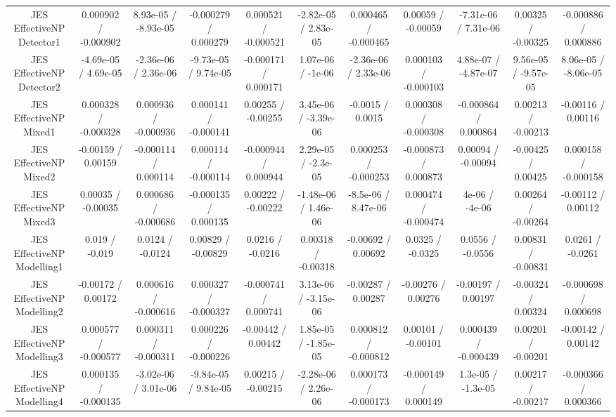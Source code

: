\begin{table}[htbp]
\begin{center}
\begin{tabular}{|c|c|c|c|c|c|c|c|c|c|c|}
  JES EffectiveNP Detector1 & 0.000902 / -0.000902 & 8.93e-05 / -8.93e-05 & -0.000279 / 0.000279 & 0.000521 / -0.000521 & -2.82e-05 / 2.83e-05 & 0.000465 / -0.000465 & 0.00059 / -0.00059 & -7.31e-06 / 7.31e-06 & 0.00325 / -0.00325 & -0.000886 / 0.000886 \\ 
  JES EffectiveNP Detector2 & -4.69e-05 / 4.69e-05 & -2.36e-06 / 2.36e-06 & -9.73e-05 / 9.74e-05 & -0.000171 / 0.000171 & 1.07e-06 / -1e-06 & -2.36e-06 / 2.33e-06 & 0.000103 / -0.000103 & 4.88e-07 / -4.87e-07 & 9.56e-05 / -9.57e-05 & 8.06e-05 / -8.06e-05 \\ 
  JES EffectiveNP Mixed1 & 0.000328 / -0.000328 & 0.000936 / -0.000936 & 0.000141 / -0.000141 & 0.00255 / -0.00255 & 3.45e-06 / -3.39e-06 & -0.0015 / 0.0015 & 0.000308 / -0.000308 & -0.000864 / 0.000864 & 0.00213 / -0.00213 & -0.00116 / 0.00116 \\ 
  JES EffectiveNP Mixed2 & -0.00159 / 0.00159 & -0.000114 / 0.000114 & 0.000114 / -0.000114 & -0.000944 / 0.000944 & 2.29e-05 / -2.3e-05 & 0.000253 / -0.000253 & -0.000873 / 0.000873 & 0.00094 / -0.00094 & -0.00425 / 0.00425 & 0.000158 / -0.000158 \\ 
  JES EffectiveNP Mixed3 & 0.00035 / -0.00035 & 0.000686 / -0.000686 & -0.000135 / 0.000135 & 0.00222 / -0.00222 & -1.48e-06 / 1.46e-06 & -8.5e-06 / 8.47e-06 & 0.000474 / -0.000474 & 4e-06 / -4e-06 & 0.00264 / -0.00264 & -0.00112 / 0.00112 \\ 
  JES EffectiveNP Modelling1 & 0.019 / -0.019 & 0.0124 / -0.0124 & 0.00829 / -0.00829 & 0.0216 / -0.0216 & 0.00318 / -0.00318 & -0.00692 / 0.00692 & 0.0325 / -0.0325 & 0.0556 / -0.0556 & 0.00831 / -0.00831 & 0.0261 / -0.0261 \\ 
  JES EffectiveNP Modelling2 & -0.00172 / 0.00172 & 0.000616 / -0.000616 & 0.000327 / -0.000327 & -0.000741 / 0.000741 & 3.13e-06 / -3.15e-06 & -0.00287 / 0.00287 & -0.00276 / 0.00276 & -0.00197 / 0.00197 & -0.00324 / 0.00324 & -0.000698 / 0.000698 \\ 
  JES EffectiveNP Modelling3 & 0.000577 / -0.000577 & 0.000311 / -0.000311 & 0.000226 / -0.000226 & -0.00442 / 0.00442 & 1.85e-05 / -1.85e-05 & 0.000812 / -0.000812 & 0.00101 / -0.00101 & 0.000439 / -0.000439 & 0.00201 / -0.00201 & -0.00142 / 0.00142 \\ 
  JES EffectiveNP Modelling4 & 0.000135 / -0.000135 & -3.02e-06 / 3.01e-06 & -9.84e-05 / 9.84e-05 & 0.00215 / -0.00215 & -2.28e-06 / 2.26e-06 & 0.000173 / -0.000173 & -0.000149 / 0.000149 & 1.3e-05 / -1.3e-05 & 0.00217 / -0.00217 & -0.000366 / 0.000366 \\ 

\end{tabular}
\end{center}
\end{table}
